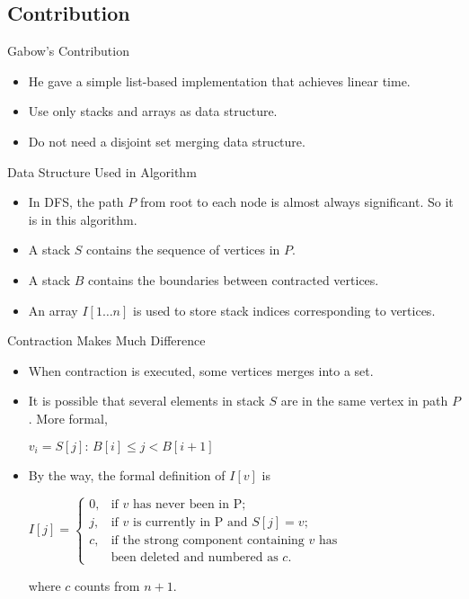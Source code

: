 \documentclass{beamer}
\begin{document}
\subsection{Contribution}

\begin{frame}{Gabow's Contribution}%

	\begin{itemize}
		\item
		He gave a simple list-based implementation that achieves linear time.
		\item
		Use only stacks and arrays as data structure. %
		\item
		Do not need a disjoint set merging data structure.
	\end{itemize}
\end{frame}

\begin{frame}{Data Structure Used in Algorithm}
	\begin{itemize}
		\item
		In DFS, the \alert{path $P$} from root to each node is almost always significant. So it is in this algorithm.
		\item
		A \alert{stack $S$} contains the sequence of vertices in $P$.
		\item
		A \alert{stack $B$} contains the boundaries between contracted vertices.
		\item
		An array \alert{$I[1\ldots n]$} is used to store stack indices corresponding to vertices.
	\end{itemize}
\end{frame}

\begin{frame}{Contraction Makes Much Difference}
	\begin{itemize}
		\item
		When contraction is executed, some vertices merges into a set.
		\item
		It is possible that several elements in stack $S$ are in the same vertex in path $P$.
		More formal, 
		\begin{center}
			$v_i={S[j]:\, B[i]\leq j< B[i+1]}$
		\end{center}
		\item
		By the way, the formal definition of $I[v]$ is
		\begin{center}
			$I[j]=\begin{cases}
			0, & \text{if }v\text{ has never been in P;} \\
			j, & \text{if }v\text{ is currently in P and }S[j]=v\text{;} \\
			c, & \text{if the strong component containing }v\text{ has}\\
			& \text{been deleted and numbered as }c\text{.}
			\end{cases}$
		\end{center}
		where $c$ counts from $n+1$.
	\end{itemize}
\end{frame}
\end{document}
